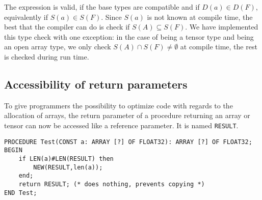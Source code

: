 \documentclass[a4wide,11pt]{article}
\newcommand{\pc}[1]{\makebox{\tt#1}}
\begin{document}
The expression \pc{P(a)} is valid, if the base types are compatible and if $D(a)\in D(F)$, equivalently if $S(a)\in S(F)$.
Since $S(a)$ is not known at compile time, the best that the compiler can do is check if $S(A) \subseteq S(F)$.
We have implemented this type check with one exception: in the case of \pc{A} being a tensor type and \pc{F} being an open array type, we only check $S(A) \cap S(F) \neq \emptyset$ at compile time, the rest is checked during run time.


\subsection{Accessibility of return parameters}

To give programmers the possibility to optimize code with regards to the allocation of arrays, the return parameter of a procedure returning an array or tensor can now be accessed like a reference parameter.
It is named \lstinline"RESULT".

\begin{lstlisting}[style=example]
PROCEDURE Test(CONST a: ARRAY [?] OF FLOAT32): ARRAY [?] OF FLOAT32;
BEGIN
    if LEN(a)#LEN(RESULT) then
        NEW(RESULT,len(a));
    end;
    return RESULT; (* does nothing, prevents copying *)
END Test;
\end{lstlisting}

\newpage
\end{document}
